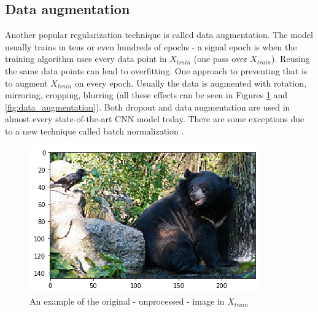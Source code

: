 \documentclass[times, utf8, diplomski]{fer}
\begin{document}
\subsection{Data augmentation}  \label{se:data_augmentation}

Another popular regularization technique is called data augmentation. The model usually trains in tens or even hundreds of epochs - a signal epoch is when the training algorithm uses every data point in $X_{train}$ (one pass over $X_{train}$). Reusing the same data points can lead to overfitting. One approach to preventing that is to augment $X_{train}$ on every epoch. Usually the data is augmented with rotation, mirroring, cropping, blurring (all these effects can be seen in Figures \ref{fig:data_augmentation_figure} and \ref{fig:data_augmentation}). Both dropout and data augmentation are used in almost every state-of-the-art CNN model today. There are some exceptions due to a new technique called batch normalization \citep{ioffe_batch_2015}.

\begin{figure}
  \includegraphics[scale=0.7]{figures/data_augmentation.png}
  \centering
  \caption{An example of the original - unprocessed - image in $X_{train}$}
  \label{fig:data_augmentation_figure}
\end{figure}
\end{document}
